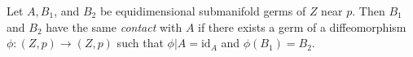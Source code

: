 Let $A, B_1$, and $B_2$ be equidimensional submanifold germs of $Z$ near $p$. Then $B_1$ and $B_2$ have the same \textit{contact} with $A$ if there exists a germ of a diffeomorphism $\phi: (Z, p) \rightarrow (Z, p)$ such that $\phi|A = \text{id}_A$ and $\phi(B_1) = B_2$.
